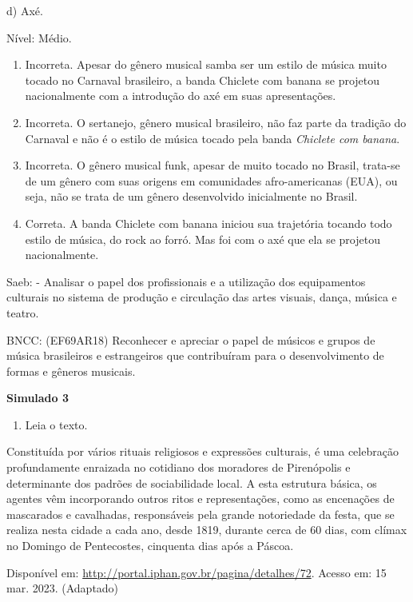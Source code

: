 \begin{escolha}
{{{{{{{{d) Axé.

Nível: Médio.

\begin{enumerate}
\def\labelenumi{\alph{enumi})}
\item
  Incorreta. Apesar do gênero musical samba ser um estilo de música
  muito tocado no Carnaval brasileiro, a banda Chiclete com banana se
  projetou nacionalmente com a introdução do axé em suas apresentações.
\item
  Incorreta. O sertanejo, gênero musical brasileiro, não faz parte da
  tradição do Carnaval e não é o estilo de música tocado pela banda
  \emph{Chiclete com banana}.
\item
  Incorreta. O gênero musical funk, apesar de muito tocado no Brasil,
  trata-se de um gênero com suas origens em comunidades afro-americanas
  (EUA), ou seja, não se trata de um gênero desenvolvido inicialmente no
  Brasil.
\item
  Correta. A banda Chiclete com banana iniciou sua trajetória tocando
  todo estilo de música, do rock ao forró. Mas foi com o axé que ela se
  projetou nacionalmente.
\end{enumerate}

Saeb: - Analisar o papel dos profissionais e a utilização dos
equipamentos culturais no sistema de produção e circulação das artes
visuais, dança, música e teatro.

BNCC: (EF69AR18) Reconhecer e apreciar o papel de músicos e grupos de
música brasileiros e estrangeiros que contribuíram para o
desenvolvimento de formas e gêneros musicais.

\textbf{Simulado 3}

\begin{enumerate}
\def\labelenumi{\arabic{enumi}.}
\item
  Leia o texto.
\end{enumerate}

Constituída por vários rituais religiosos e expressões culturais, é uma
celebração profundamente enraizada no cotidiano dos moradores de
Pirenópolis e determinante dos padrões de sociabilidade local. A esta
estrutura básica, os agentes vêm incorporando outros ritos e
representações, como as encenações de mascarados e cavalhadas,
responsáveis pela grande notoriedade da festa, que se realiza nesta
cidade a cada ano, desde 1819, durante cerca de 60 dias, com clímax no
Domingo de Pentecostes, cinquenta dias após a Páscoa.

Disponível em: \url{http://portal.iphan.gov.br/pagina/detalhes/72}.
Acesso em: 15 mar. 2023. (Adaptado)

}}}}}}}}
\end{escolha}
